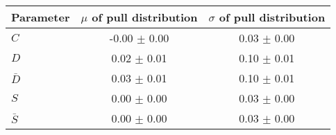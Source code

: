 \begin{tabular}{l  c  c}
\hline
Parameter & $\mu$ of pull distribution & $\sigma$ of pull distribution \\
\hline
\hline
$C$ & -0.00 $\pm$ 0.00 & 0.03 $\pm$ 0.00 \\
$D$ & 0.02 $\pm$ 0.01 & 0.10 $\pm$ 0.01 \\
$\bar{D}$ & 0.03 $\pm$ 0.01 & 0.10 $\pm$ 0.01 \\
$S$ & 0.00 $\pm$ 0.00 & 0.03 $\pm$ 0.00 \\
$\bar{S}$ & 0.00 $\pm$ 0.00 & 0.03 $\pm$ 0.00 \\
\hline
\end{tabular}
